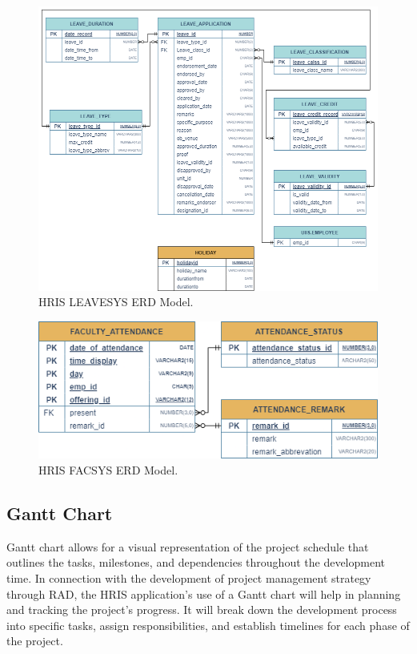     \begin{figure}[H]
        \centering
        \includegraphics[width=1\linewidth]{figures/fig-erd-leavesys.png}
        \caption{HRIS LEAVESYS ERD Model.}
        \label{fig:enter-label}
    \end{figure}

    \begin{figure}[H]
        \centering
        \includegraphics[width=1\linewidth]{figures/fig-erd-facsys.png}
        \caption{HRIS FACSYS ERD Model.}
        \label{fig:enter-label}
    \end{figure}
    
    \subsection{Gantt Chart}
    
    Gantt chart allows for a visual representation of the project schedule that outlines the tasks, milestones, and dependencies throughout the development time. In connection with the development of project management strategy through RAD, the HRIS application's use of a Gantt chart will help in planning and tracking the project's progress. It will break down the development process into specific tasks, assign responsibilities, and establish timelines for each phase of the project.
    \\
    
